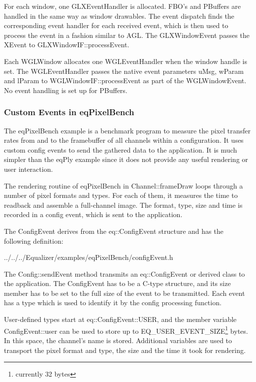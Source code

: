 \documentclass[10pt,a4]{scrartcl}
\begin{document}
For each window, one \textsf{GLXEventHandler} is allocated. FBO's and PBuffers
are handled in the same way as window drawables. The event dispatch finds the
corresponding event handler for each received event, which is then used to
process the event in a fashion similar to AGL. The \textsf{GLXWindowEvent}
passes the \textsf{XEvent} to \textsf{GLXWindowIF::\-process\-Event}.

Each \textsf{WGLWindow} allocates one \textsf{WGLEventHandler} when the
window handle is set. The WGLEventHandler passes the native event
parameters \textsf{uMsg}, \textsf{wParam} and \textsf{lParam} to
\textsf{WGL\-Win\-dowIF::processEvent} as part of the
\textsf{WGLWindowEvent}. No event handling is set up for PBuffers.

\subsubsection{Custom Events in eqPixelBench}

The \textsf{eqPixelBench} example is a benchmark program to measure the
pixel transfer rates from and to the framebuffer of all channels within
a configuration. It uses custom config events to send the gathered data
to the application. It is much simpler than the \textsf{eqPly} example
since it does not provide any useful rendering or user interaction.

The rendering routine of \textsf{eqPixelBench} in
\textsf{Channel::frameDraw} loops through a number of pixel formats and
types. For each of them, it measures the time to readback and assemble a
full-channel image. The format, type, size and time is recorded in a
config event, which is sent to the application.

The \textsf{ConfigEvent} derives from the \textsf{eq::ConfigEvent}
structure and has the following definition:

{\footnotesize
  {../../../Equalizer/examples/eqPixelBench/configEvent.h}}


The \textsf{Config::sendEvent} method transmits an
\textsf{eq::ConfigEvent} or derived class to the application. The
ConfigEvent has to be a C-type structure, and its \textsf{size}
member has to be set to the full size of the event to be transmitted.
Each event has a type which is used to identify it by the config 
processing function.

User-defined types start at \textsf{eq::ConfigEvent::USER}, and the
member variable \textsf{ConfigEvent::user} can be used to store up to
\textsf{EQ\_USER\_EVENT\_SIZE}\footnote{currently 32 bytes} bytes. In
this space, the channel's name is stored. Additional variables are used
to transport the pixel format and type, the size and the time it took
for rendering.
\end{document}
